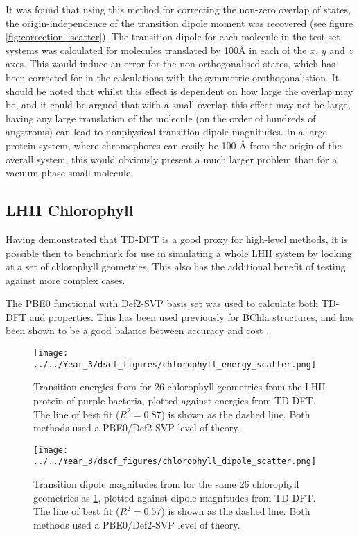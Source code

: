 It was found that using this method for correcting the non-zero overlap of states, 
the origin-independence of the transition dipole moment was recovered (see figure
\ref{fig:correction_scatter}).
The transition dipole for each molecule in the test set systems was calculated
for molecules translated by 100\AA{} in each of the $x$, $y$ and $z$ axes.
This would induce an error for the non-orthogonalised states, which has been
corrected for in the calculations with the symmetric orothogonalistion.
It should be noted that whilst this effect is dependent on how large the overlap may be, and
it could be argued that with a small overlap this effect may not be large, having 
any large translation of the molecule (on the order of hundreds of angstroms) can
lead to nonphysical transition dipole magnitudes. In a large protein system, where
chromophores can easily be 100 \AA{} from the origin of the overall system, 
this would obviously present a much larger problem than for a vacuum-phase small molecule.

\subsection{LHII Chlorophyll}
\label{subsec:dscf_chl_tests}
Having demonstrated that TD-DFT is a good proxy for high-level methods, it is possible
then to benchmark \dscf for use in simulating a whole LHII system by looking at
a set of chlorophyll geometries. This also has the additional benefit of testing
\dscf against more complex cases.

The PBE0 functional with Def2-SVP basis set \cite{Adamo1999, Schafer1992} was used
to calculate both TD-DFT and \dscf properties. This has been used previously for 
BChla structures, and has been shown to be a good balance between accuracy and cost 
\cite{Stross2016}. 

\begin{figure}
\centering
\texttt{[image: ../../Year\_3/dscf\_figures/chlorophyll\_energy\_scatter.png]}
\label{fig:chl_energy}
\caption{Transition energies from \dscf for 26 chlorophyll geometries from the LHII
protein of purple bacteria,  plotted against energies from TD-DFT. The line of
best fit ($R^2=0.87$) is shown as the dashed line. Both methods used a PBE0/Def2-SVP 
level of theory.}
\end{figure}

\begin{figure}
\centering
\texttt{[image: ../../Year\_3/dscf\_figures/chlorophyll\_dipole\_scatter.png]}
\caption{Transition dipole magnitudes from \dscf for the same 26 chlorophyll geometries as
\ref{fig:chl_energy}, plotted against dipole magnitudes from TD-DFT. The line of
best fit ($R^2= 0.57$) is shown as the dashed line. Both methods used a PBE0/Def2-SVP
level of theory.}
\label{fig:chl_dipole}
\end{figure}

